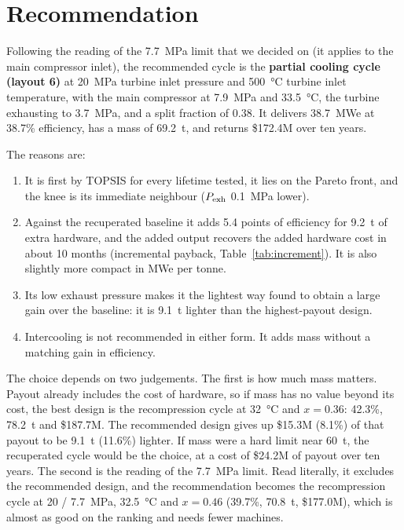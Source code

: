 \section{Recommendation}
Following the reading of the \SI{7.7}{MPa} limit that we decided on (it applies to the main compressor inlet), the recommended cycle is the \textbf{partial cooling cycle (layout 6)} at \SI{20}{MPa} turbine inlet pressure and \SI{500}{\celsius} turbine inlet temperature, with the main compressor at \SI{7.9}{MPa} and \SI{33.5}{\celsius}, the turbine exhausting to \SI{3.7}{MPa}, and a split fraction of 0.38. It delivers \SI{38.7}{MWe} at 38.7\% efficiency, has a mass of \SI{69.2}{t}, and returns \$172.4M over ten years.

The reasons are:
\begin{enumerate}
  \item It is first by TOPSIS for every lifetime tested, it lies on the Pareto front, and the knee is its immediate neighbour ($P_\mathrm{exh}$ \SI{0.1}{MPa} lower).
  \item Against the recuperated baseline it adds 5.4 points of efficiency for \SI{9.2}{t} of extra hardware, and the added output recovers the added hardware cost in about 10 months (incremental payback, Table~\ref{tab:increment}). It is also slightly more compact in MWe per tonne.
  \item Its low exhaust pressure makes it the lightest way found to obtain a large gain over the baseline: it is \SI{9.1}{t} lighter than the highest-payout design.
  \item Intercooling is not recommended in either form. It adds mass without a matching gain in efficiency.
\end{enumerate}

The choice depends on two judgements. The first is how much mass matters. Payout already includes the cost of hardware, so if mass has no value beyond its cost, the best design is the recompression cycle at \SI{32}{\celsius} and $x = 0.36$: 42.3\%, \SI{78.2}{t} and \$187.7M. The recommended design gives up \$15.3M (8.1\%) of that payout to be \SI{9.1}{t} (11.6\%) lighter. If mass were a hard limit near \SI{60}{t}, the recuperated cycle would be the choice, at a cost of \$24.2M of payout over ten years. The second is the reading of the \SI{7.7}{MPa} limit. Read literally, it excludes the recommended design, and the recommendation becomes the recompression cycle at 20 / \SI{7.7}{MPa}, \SI{32.5}{\celsius} and $x = 0.46$ (39.7\%, \SI{70.8}{t}, \$177.0M), which is almost as good on the ranking and needs fewer machines.

